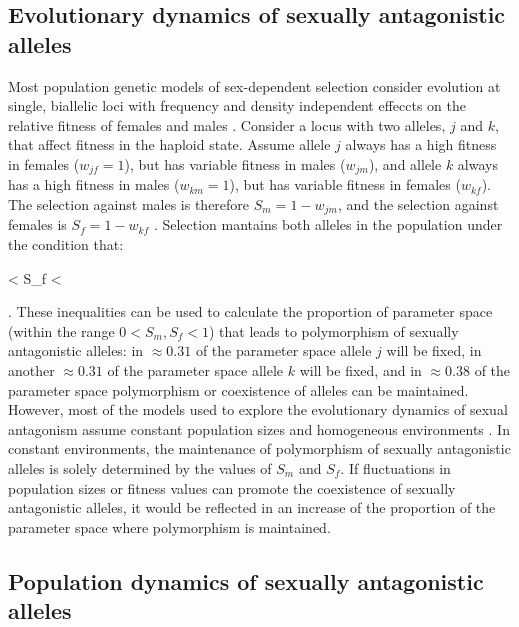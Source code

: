 \documentclass[12pt]{article}
\let\oldequation\equation
\let\oldendequation\endequation
\renewenvironment{equation}
  {\linenomathNonumbers\oldequation}
  {\oldendequation\endlinenomath}
\begin{document}
\subsection*{Evolutionary dynamics of sexually antagonistic alleles}

 Most population genetic models of sex-dependent selection consider evolution at single, biallelic  loci with frequency and density independent effeccts on the relative fitness of females and males \citep{wright1942statistical,kidwell1977regions, immler2012ploidally}. Consider a locus with two alleles, $j$ and $k$, that affect fitness in the haploid state.  Assume allele $j$ always has a high fitness in females ($w_{jf} = 1$), but has variable fitness in males ($w_{jm}$), and allele $k$ always has a high fitness in males ($w_{km} = 1$), but has variable fitness in females ($w_{kf}$). The selection against males is therefore $S_{m}= 1 - w_{jm}$, and the selection against females is $S_{f}= 1 - w_{kf}$ . Selection mantains both alleles in the population under the condition that:

 \begin{equation}
 < S_{f} < 
\label{selection}
 \end{equation}

\citep{kidwell1977regions,pamilo1979genic,connallon_evolutionary_2018}. These inequalities can be used to calculate the proportion of parameter space (within the range $ 0 < S_{m}, S_{f} < 1$) that leads to polymorphism of sexually antagonistic alleles: in $\approx 0.31$ of the parameter space allele $j$ will be fixed, in another $\approx 0.31$ of the parameter space allele $k$ will be fixed, and in $\approx 0.38$ of the parameter space polymorphism or coexistence of alleles can be maintained. However, most of the models used to explore the evolutionary dynamics of sexual antagonism assume constant population sizes and homogeneous environments \citep{kidwell1977regions,pamilo1979genic}. In constant environments, the maintenance of polymorphism of sexually antagonistic alleles is solely determined by the values of $S_{m}$ and $S_{f}$. If fluctuations in population sizes or fitness values can promote the coexistence of sexually antagonistic alleles, it would be reflected in an increase of the proportion of the parameter space where polymorphism is maintained.


\subsection*{Population dynamics of sexually antagonistic alleles}
\end{document}
